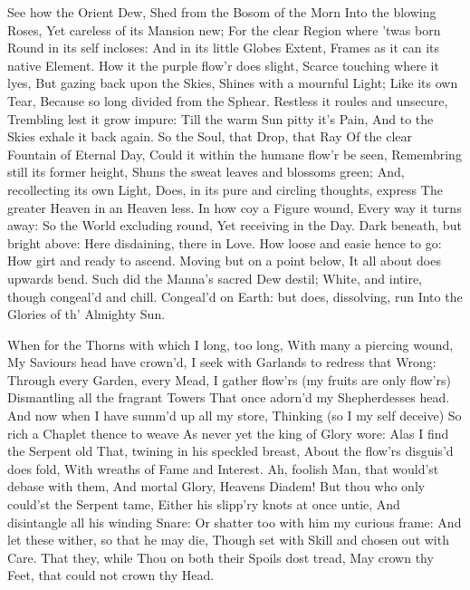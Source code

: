 \documentclass{book}
\newenvironment{poem}[1]%
  {\poemtitle{#1}%
   \Versus
   \numerus{1}%
  }
  {\endVersus}
\begin{document}
\begin{poem}{On a Drop of Dew}
\Forma{}%
See how the Orient Dew,
Shed from the Bosom of the Morn \auto
Into the blowing Roses,
Yet careless of its Mansion new;
For the clear Region where 'twas born  
Round in its self incloses:
And in its little Globes Extent,
Frames as it can its native Element.
How it the purple flow'r does slight,
Scarce touching where it lyes,
But gazing back upon the Skies,
Shines with a mournful Light;
Like its own Tear,
Because so long divided from the Sphear.
Restless it roules and unsecure,
Trembling lest it grow impure:
Till the warm Sun pitty it's Pain,
And to the Skies exhale it back again.
So the Soul, that Drop, that Ray
Of the clear Fountain of Eternal Day,
Could it within the humane flow'r be seen,
Remembring still its former height,
Shuns the sweat leaves and blossoms green;
And, recollecting its own Light,
Does, in its pure and circling thoughts, express
The greater Heaven in an Heaven less.
In how coy a Figure wound,
Every way it turns away:
So the World excluding round,
Yet receiving in the Day.
Dark beneath, but bright above:
Here disdaining, there in Love.
How loose and easie hence to go:
How girt and ready to ascend.
Moving but on a point below,
It all about does upwards bend.
Such did the Manna's sacred Dew destil;
White, and intire, though congeal'd and chill.
Congeal'd on Earth: but does, dissolving, run
Into the Glories of th' Almighty Sun.
\endDrama
\end{poem}
\begin{poem}{The Coronet}   
\Forma{}%
      
  When for the Thorns with which I long, too long, \auto       
          With many a piercing wound,        
          My Saviours head have crown'd,        
  I seek with Garlands to redress that Wrong:        
      Through every Garden, every Mead,       
  I gather flow'rs (my fruits are only flow'rs)        
      Dismantling all the fragrant Towers        
  That once adorn'd my Shepherdesses head.        
  And now when I have summ'd up all my store,        
      Thinking (so I my self deceive)       
      So rich a Chaplet thence to weave        
  As never yet the king of Glory wore:        
      Alas I find the Serpent old        
      That, twining in his speckled breast,        
      About the flow'rs disguis'd does fold,       
      With wreaths of Fame and Interest.        
\Forma\strophae{}%
  Ah, foolish Man, that would'st debase with them,        
  And mortal Glory, Heavens Diadem!        
  But thou who only could'st the Serpent tame,        
  Either his slipp'ry knots at once untie,       
  And disintangle all his winding Snare:        
  Or shatter too with him my curious frame:        
  And let these wither, so that he may die,        
  Though set with Skill and chosen out with Care.        
  That they, while Thou on both their Spoils dost tread,       
  May crown thy Feet, that could not crown thy Head.        
\end{poem}
\endDrama
\clearpage
\end{document}
